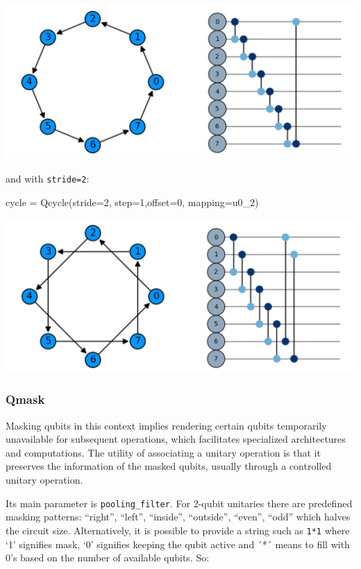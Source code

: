 \documentclass[
  13pt,
  a4paper,
  DIV=11,
  numbers=noendperiod]{scrreprt}
\newenvironment{Shaded}{\begin{snugshade}}{\end{snugshade}}
\newcommand{\DecValTok}[1]{\textcolor[rgb]{0.68,0.00,0.00}{#1}}
\newcommand{\NormalTok}[1]{\textcolor[rgb]{0.00,0.23,0.31}{#1}}
\newcommand{\OperatorTok}[1]{\textcolor[rgb]{0.37,0.37,0.37}{#1}}
\begin{document}
\includegraphics{chapters/../img/stride_1.png}

and with \texttt{stride=2}:

\begin{Shaded}
\begin{Highlighting}[]
\NormalTok{cycle }\OperatorTok{=}\NormalTok{ Qcycle(stride}\OperatorTok{=}\DecValTok{2}\NormalTok{, step}\OperatorTok{=}\DecValTok{1}\NormalTok{,offset}\OperatorTok{=}\DecValTok{0}\NormalTok{, mapping}\OperatorTok{=}\NormalTok{u0\_2)}
\end{Highlighting}
\end{Shaded}

\includegraphics{chapters/../img/stride_2.png}

\subsubsection{Qmask}\label{qmask}

Masking qubits in this context implies rendering certain qubits
temporarily unavailable for subsequent operations, which facilitates
specialized architectures and computations. The utility of associating a
unitary operation is that it preserves the information of the masked
qubits, usually through a controlled unitary operation.

Its main parameter is \texttt{pooling\_filter}. For 2-qubit unitaries
there are predefined masking patterns: ``right'', ``left'', ``inside'',
``outside'', ``even'', ``odd'' which halves the circuit size.
Alternatively, it is possible to provide a string such as \texttt{1*1}
where `1' signifies mask, `0' signifies keeping the qubit active and ´*´
means to fill with 0's based on the number of available qubits. So:
\end{document}
